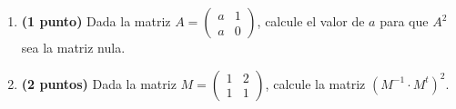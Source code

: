 
\begin{enumerate}[label=\alph*)]
\item \textbf{(1 punto)} Dada la matriz $A=\begin{pmatrix}a&1\\a&0\end{pmatrix}$, calcule el valor de $a$ para que $A^2$ sea la matriz nula.
\item \textbf{(2 puntos)} Dada la matriz $M=\begin{pmatrix}1&2\\1&1\end{pmatrix}$, calcule la matriz $\left(M^{-1}\cdot M^t\right)^2$.
\end{enumerate}
